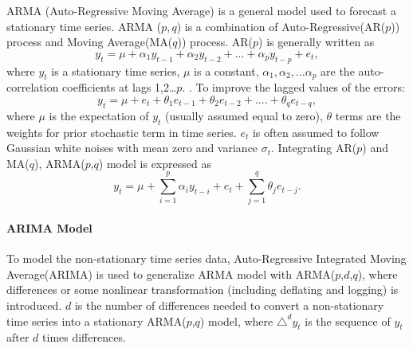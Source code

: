 ARMA (Auto-Regressive Moving Average) is a general model used to forecast a stationary time series. ARMA ($p,q$) is a combination of Auto-Regressive(AR($p$)) process and Moving Average(MA($q$)) process. AR($p$) is generally written as 
\begin{equation}
				y_t = \mu + \alpha_1{y_{t-1}}+\alpha_2{y_{t-2}}+...+\alpha_p{y_{t-p}}+e_t,
\end{equation}
where $y_t$ is a stationary time series, $\mu$ is a constant, $\alpha_1,\alpha_2,...\alpha_p$ are the auto-correlation coefficients at lags 1,2…$p$. .  To improve  the lagged values of the errors:
\begin{equation}
	y_t = \mu + e_t+\theta_1{e_{t-1}}+\theta_2{e_{t-2}}+....+\theta_q{e_{t-q}},
\end{equation}
where $\mu$ is the expectation of $y_t$ (usually assumed equal to zero), $\theta$ terms are the weights for prior stochastic term in time series. $e_t$ is often assumed to follow Gaussian white noises with mean zero and variance $\sigma_t$. 
Integrating AR($p$) and MA($q$), ARMA($p$,$q$) model is expressed as
\begin{equation}
   y_t = \mu + \sum_{i=1}^{p} {\alpha_i{y_{t-i}}} + e_t+ \sum_{j=1}^{q} {\theta_j{e_{t-j}}}.
\end{equation}

\paragraph{ARIMA Model}

 To model the non-stationary time series data,  Auto-Regressive Integrated Moving Average(ARIMA) is used to generalize ARMA model with ARMA($p$,$d$,$q$), where  differences or some nonlinear transformation (including deflating and logging) is introduced. $d$ is the number of differences needed to convert a non-stationary time series into a stationary  ARMA($p$,$q$) model, where $\triangle^d$$y_t$ is the sequence of $y_t$ after $d$ times differences. 

